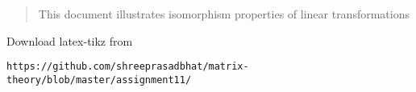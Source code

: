 \documentclass[journal,12pt,twocolumn]{IEEEtran}
\begin{document}
% 
\maketitle
\newpage
\bigskip
\renewcommand{\thefigure}{\theenumi}
\renewcommand{\thetable}{\theenumi}

%
%
\begin{abstract}
This document illustrates isomorphism properties of linear transformations
\end{abstract}
Download latex-tikz from
\begin{lstlisting}
https://github.com/shreeprasadbhat/matrix-theory/blob/master/assignment11/
\end{lstlisting}
%
\end{document}
